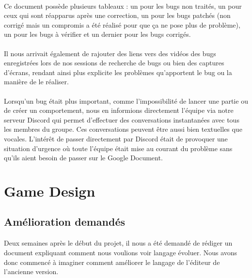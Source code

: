 \documentclass{report}
\begin{document}
\paragraph{}
  Ce document possède plusieurs tableaux : un pour les bugs non traités, un pour ceux qui sont réapparus après une correction, un pour les bugs patchés (non corrigé mais un compromis a été réalisé pour que ça ne pose plus de problème), un pour les bugs à vérifier et un dernier pour les bugs corrigés.
\paragraph{}
Il nous arrivait également de rajouter des liens vers des vidéos des bugs enregistrées lors de nos sessions de recherche de bugs ou bien des captures d’écrans, rendant ainsi plus explicite les problèmes qu’apportent le bug ou la manière de le réaliser.
\paragraph{}
Lorsqu’un bug était plus important, comme l’impossibilité de lancer une partie ou de créer un comportement, nous en informions directement l’équipe via notre serveur Discord qui permet d’effectuer des conversations instantanées avec tous les membres du groupe. Ces conversations peuvent être aussi bien textuelles que vocales. L’intérêt de passer directement par Discord était de provoquer une situation d’urgence où toute l’équipe était mise au courant du problème sans qu’ils aient besoin de passer sur le Google Document. 

\section{Game Design}

\subsection{Amélioration demandés}
\paragraph{}
  Deux semaines après le début du projet, il nous a été demandé de rédiger un document expliquant comment nous voulions voir langage évoluer. Nous avons donc commencé à imaginer comment améliorer le langage de l’éditeur de l’ancienne version.
\end{document}
